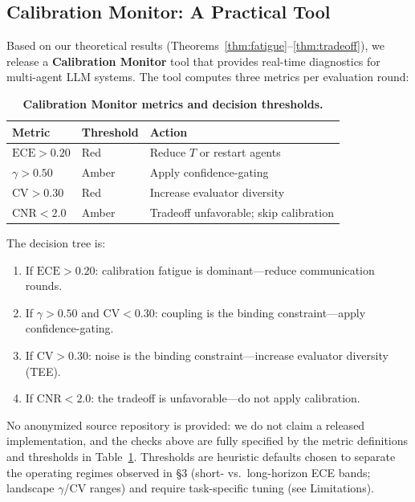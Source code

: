 \documentclass[11pt]{article}
\newcommand{\CV}{\ensuremath{\mathrm{CV}}}
\newcommand{\ECE}{\ensuremath{\mathrm{ECE}}}
\theoremstyle{definition}
\theoremstyle{remark}
\begin{document}
\subsection{Calibration Monitor: A Practical Tool}\label{sec:monitor}

Based on our theoretical results (Theorems~\ref{thm:fatigue}--\ref{thm:tradeoff}), we release a \textbf{Calibration Monitor} tool that provides real-time diagnostics for multi-agent LLM systems. The tool computes three metrics per evaluation round:

\begin{table}[H]
\centering
\caption{\textbf{Calibration Monitor metrics and decision thresholds.}}
\label{tab:monitor}
\begin{tabular}{@{}lll@{}}
\toprule
Metric & Threshold & Action \\
\midrule
$\ECE > 0.20$ & Red & Reduce $T$ or restart agents \\
$\gamma > 0.50$ & Amber & Apply confidence-gating \\
$\CV > 0.30$ & Red & Increase evaluator diversity \\
$\text{CNR} < 2.0$ & Amber & Tradeoff unfavorable; skip calibration \\
\bottomrule
\end{tabular}
\end{table}

The decision tree is:
\begin{enumerate}[leftmargin=*,nosep]
    \item If $\ECE > 0.20$: calibration fatigue is dominant---reduce communication rounds.
    \item If $\gamma > 0.50$ and $\CV < 0.30$: coupling is the binding constraint---apply confidence-gating.
    \item If $\CV > 0.30$: noise is the binding constraint---increase evaluator diversity (TEE).
    \item If $\text{CNR} < 2.0$: the tradeoff is unfavorable---do not apply calibration.
\end{enumerate}

\noindent No anonymized source repository is provided: we do not claim a released implementation, and the checks above are fully specified by the metric definitions and thresholds in Table~\ref{tab:monitor}. Thresholds are heuristic defaults chosen to separate the operating regimes observed in \S3 (short- vs.\ long-horizon ECE bands; landscape $\gamma$/$\CV$ ranges) and require task-specific tuning (see Limitations).
\end{document}
